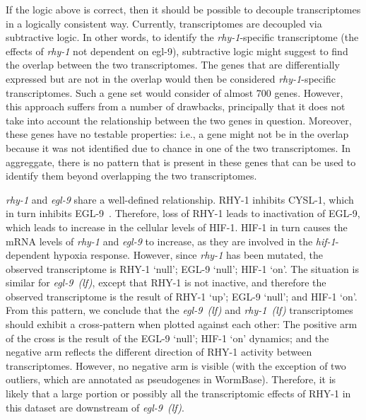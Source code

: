 \documentclass[9pt,twocolumn,twoside]{pnas-new}
\newcommand{\gene}[1]{\emph{#1}}
\newcommand{\egl}{\emph{egl-9~(lf)}}
\newcommand{\rhy}{\emph{rhy-1~(lf)}}
\newcommand{\eglp}{EGL-9}
\newcommand{\rhyp}{RHY-1}
\newcommand{\hifp}{HIF-1}
\newcommand{\cyslp}{CYSL-1}
\begin{document}
If the logic above is correct, then it should be possible to decouple
transcriptomes in a logically consistent way. Currently, transcriptomes are
decoupled via subtractive logic. In other words, to identify the
\gene{rhy-1}-specific
transcriptome (the effects of \gene{rhy-1} not dependent on \gene{}egl-9),
subtractive logic
might suggest to find the overlap between the two transcriptomes. The genes that
are differentially expressed but are not in the overlap would then be considered
\gene{rhy-1}-specific transcriptomes. Such a gene set would consider of almost
700 genes. However, this approach suffers from a number of
drawbacks, principally that it does not take into account the relationship
between the two genes in question. Moreover, these genes have no testable properties:
i.e., a gene might not be in the overlap because it was not identified due to
chance in one of the two transcriptomes. In aggreggate, there is no pattern that
is present in these genes that can be used to identify them beyond overlapping
the two transcriptomes.

\gene{rhy-1} and \gene{egl-9} share a well-defined relationship. \rhyp{}
inhibits \cyslp{},
which in turn inhibits \eglp{}~\cite{Ma2012}. Therefore, loss of \rhyp{} leads
to inactivation of \eglp{}, which leads to increase in the cellular levels of
\hifp{}. \hifp{} in turn causes the mRNA levels of \gene{rhy-1} and \gene{egl-9}
to increase,
as they are involved in the \gene{hif-1}-dependent hypoxia response. However, since
\gene{rhy-1} has been mutated, the observed transcriptome is
\rhyp{} `null'; \eglp{} `null'; \hifp{} `on'. The situation is similar for
\egl{}, except that \rhyp{}
is not inactive, and therefore the observed transcriptome is the result of
\rhyp{} `up'; \eglp{} `null'; and \hifp{} `on'. From this pattern, we conclude that
the \egl{} and \rhy{} transcriptomes should exhibit a cross-pattern when plotted
against each other: The positive
arm of the cross is the result of the \eglp{} `null'; \hifp{} `on' dynamics; and the
negative arm reflects the different direction of \rhyp{} activity between
transcriptomes. However, no negative arm is visible (with the exception of two
outliers, which are annotated as pseudogenes in WormBase). Therefore, it is likely
that a large portion or possibly all the transcriptomic effects of \rhyp{} in
this dataset are downstream of \egl{}.
\end{document}
